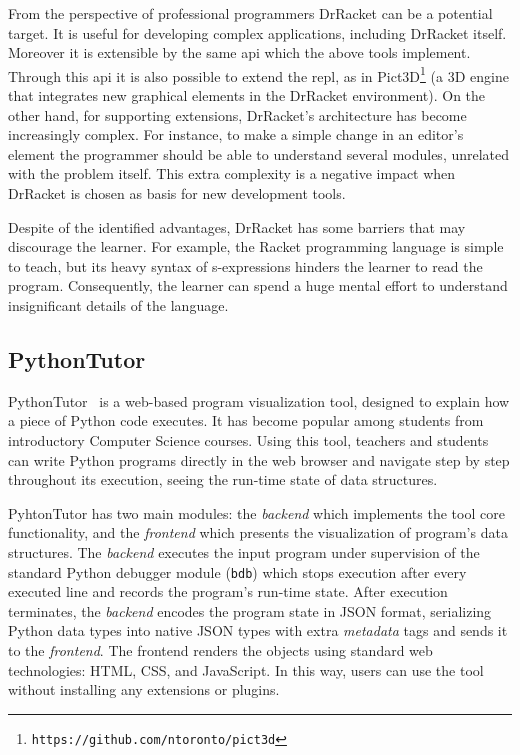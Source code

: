 From the perspective of professional programmers DrRacket can be a potential target. It is useful for developing complex applications, including DrRacket itself. Moreover it is extensible by the same \gls{api} which the above tools implement. Through this \gls{api} it is also possible to extend the \gls{repl}, as in Pict3D\footnote{\texttt{https://github.com/ntoronto/pict3d}} (a 3D engine that integrates new graphical elements in the DrRacket environment). On the other hand, for supporting extensions, DrRacket's architecture has become increasingly complex. For instance, to make a simple change in an editor's element the programmer should be able to understand several modules, unrelated with the problem itself. This extra complexity is a negative impact when DrRacket is chosen as basis for new development tools.

Despite of the identified advantages, DrRacket has some barriers that may discourage the learner. For example, the Racket programming language is simple to teach, but its heavy syntax of s-expressions hinders the learner to read the program. Consequently, the learner can spend a huge mental effort to understand insignificant details of the language.
\subsection{PythonTutor}
\label{subsec:pythontutor}
PythonTutor~\citep{GuoSIGCSE2013} is a web-based program visualization tool, designed to explain how a piece of Python code executes. It has become popular among students from introductory Computer Science courses. Using this tool, teachers and students can write Python programs directly in the web browser and navigate step by step throughout its execution, seeing the run-time state of data structures.

PyhtonTutor has two main modules: the \textit{backend} which implements the tool core functionality, and the \textit{frontend} which presents the visualization of program's data structures. The \textit{backend} executes the input program under supervision of the standard Python debugger module (\texttt{bdb}) which stops execution after every executed line and records the program's run-time state. After execution terminates, the \textit{backend} encodes the program state in JSON format, serializing Python data types into native JSON types with extra \textit{metadata} tags and sends it to the \textit{frontend}. The frontend renders the objects using standard web technologies: HTML, CSS, and JavaScript. In this way, users can use the tool without installing any extensions or plugins.

